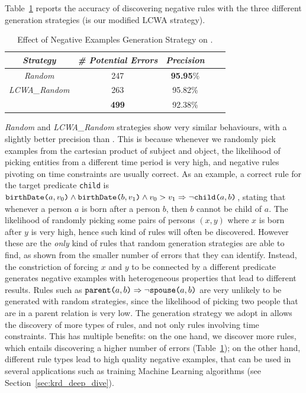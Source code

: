 Table~\ref{tab:random_neg_examples} reports the accuracy of discovering negative rules with the three different generation strategies (\krd is our modified LCWA strategy).
\begin{table}[t]
	\centering
	\caption{Effect of Negative Examples Generation Strategy on \dbpedia.}
	\label{tab:random_neg_examples}
	\begin{tabular}{|c|c|c|c|c|}
		\hline
		\hline
		{\it Strategy}&{\it \# Potential Errors} & {\it Precision} \tabularnewline
		\hline
		\emph{Random} & 247 & \textbf{95.95}\%\tabularnewline
		\emph{LCWA\_Random} & 263 & 95.82\% \tabularnewline
		\krd & \textbf{499} & 92.38\%\tabularnewline
		\hline
	\end{tabular}
\end{table}
\emph{Random} and \emph{LCWA\_Random} strategies show very similar behaviours, with a slightly better precision than \krd. This is because whenever we randomly pick examples from the cartesian product of subject and object, the likelihood of picking entities from a different time period is very high, and negative rules pivoting on time constraints are usually correct.
As an example, a correct rule for the target predicate \texttt{child} is $\texttt{birthDate(}a,v_0\texttt{)} \wedge \texttt{birthDate(}b,v_1\texttt{)} \wedge v_0 > v_1 \Rightarrow \neg \texttt{child(}a,b\texttt{)}$, stating that whenever a person $a$ is born after a person $b$, then $b$ cannot be child of $a$.
The likelihood of randomly picking some pairs of persons $(x,y)$ where $x$ is born after $y$ is very high, hence such kind of rules will often be discovered. However these are the \emph{only} kind of rules that random generation strategies are able to find, as shown from the smaller number of errors that they can identify. 
Instead, the constriction of forcing $x$ and $y$ to be connected by a different predicate generates  negative examples with heterogeneous properties that lead to different results. Rules such as $\texttt{parent(}a,b\texttt{)} \Rightarrow \neg \texttt{spouse(}a,b\texttt{)}$ are very unlikely to be generated with random strategies, since the likelihood of picking two people that are in a parent relation is very low. The generation strategy we adopt in \krd allows the discovery of more types of rules, and not only rules involving time constraints. This has multiple benefits: on the one hand, we discover more rules, which entails discovering a higher number of errors (Table~\ref{tab:random_neg_examples}); on the other hand, different rule types lead to high quality negative examples, that can be used in several applications such as training Machine Learning algorithms (see Section~\ref{sec:krd_deep_dive}).
